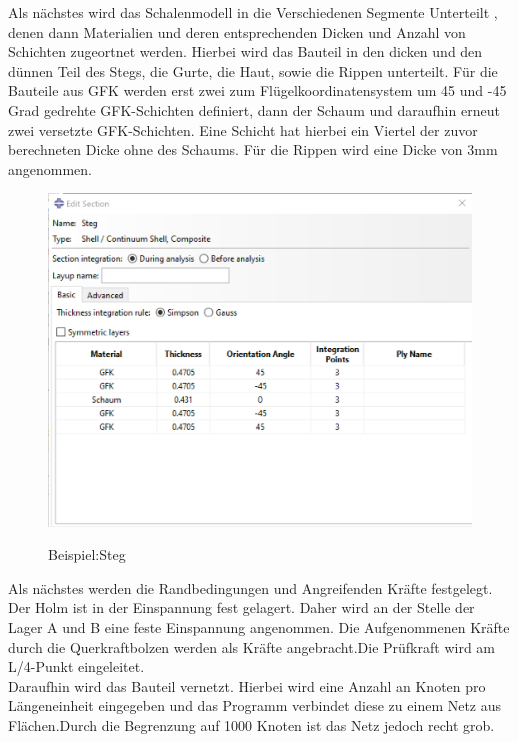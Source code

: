 Als nächstes wird das Schalenmodell in die Verschiedenen Segmente Unterteilt , denen dann Materialien und deren entsprechenden Dicken und Anzahl von Schichten zugeortnet werden. Hierbei wird das Bauteil in den dicken und den dünnen Teil des Stegs, die Gurte, die Haut, sowie die Rippen unterteilt. Für die Bauteile aus GFK werden erst zwei zum Flügelkoordinatensystem um 45 und -45 Grad gedrehte GFK-Schichten definiert, dann der Schaum und daraufhin erneut zwei versetzte GFK-Schichten. Eine Schicht hat hierbei ein Viertel der zuvor berechneten Dicke ohne des Schaums. Für die Rippen wird eine Dicke von 3mm angenommen.
\begin{figure}[h]
 \centering
 \includegraphics[scale=0.4]{Bilder/Steg_Material}
 \label{Steg_Material}
 \caption{Beispiel:Steg}
\end{figure}
Als nächstes werden die Randbedingungen und Angreifenden Kräfte festgelegt. Der Holm ist in der Einspannung fest gelagert. Daher wird an der Stelle der Lager A und B eine feste Einspannung angenommen. Die Aufgenommenen Kräfte durch die Querkraftbolzen werden als Kräfte angebracht.Die Prüfkraft wird am L/4-Punkt eingeleitet.\\
Daraufhin wird das Bauteil vernetzt. Hierbei wird eine Anzahl an Knoten pro Längeneinheit eingegeben und das Programm verbindet diese zu einem Netz aus Flächen.Durch die Begrenzung auf 1000 Knoten ist das Netz jedoch recht grob. \\
\newpage
